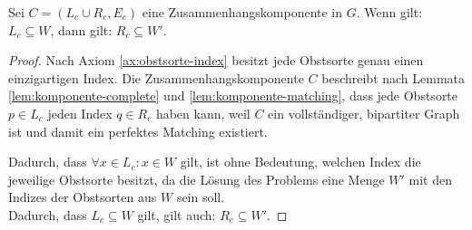 \begin{lemma}\label{lem:komponente-all-wunschliste}
Sei $C = (L_c \cup R_c, E_c)$ eine Zusammenhangskomponente in $G$.
Wenn gilt: $L_c \subseteq W$, dann gilt: $R_c \subseteq W'$.

\end{lemma}
\begin{proof} 
Nach Axiom \ref{ax:obstsorte-index} besitzt jede Obstsorte genau einen einzigartigen Index.
Die Zusammenhangskomponente $C$ beschreibt nach Lemmata \ref{lem:komponente-complete} und \ref{lem:komponente-matching},
dass jede Obstsorte $p \in L_c$ jeden Index $q \in R_c$ haben kann, weil $C$ ein vollständiger, bipartiter Graph ist und damit ein perfektes Matching existiert.

Dadurch, dass $\forall x \in L_c : x \in W$ gilt,
ist ohne Bedeutung, welchen Index die jeweilige Obstsorte besitzt, da
 die Lösung des Problems eine Menge $W'$ mit den Indizes der Obstsorten aus $W$ sein soll.\\
Dadurch, dass $L_c \subseteq W$ gilt, gilt auch: $R_c \subseteq W'$. 
\end{proof}
